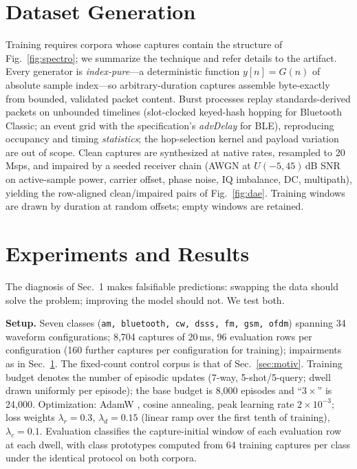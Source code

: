 \documentclass[10pt,twocolumn]{article}
\begin{document}
\section{Dataset Generation}
\label{sec:synth}
Training requires corpora whose captures contain the structure of
Fig.~\ref{fig:spectro}; we summarize the technique and refer details to
the artifact. Every generator is \emph{index-pure}---a deterministic
function $y[n]=G(n)$ of absolute sample index---so arbitrary-duration
captures assemble byte-exactly from bounded, validated packet content.
Burst processes replay standards-derived packets \cite{btcore} on
unbounded timelines (slot-clocked keyed-hash hopping for Bluetooth
Classic; an event grid with the specification's \textit{advDelay} for
BLE), reproducing occupancy and timing \emph{statistics}; the
hop-selection kernel and payload variation are out of scope. Clean
captures are synthesized at native rates, resampled to 20\,Msps, and
impaired by a seeded receiver chain (AWGN at $U(-5,45)$\,dB SNR on
active-sample power, carrier offset, phase noise, IQ imbalance, DC,
multipath), yielding the row-aligned clean/impaired pairs of
Fig.~\ref{fig:dae}. Training windows are drawn by duration at random
offsets; empty windows are retained.

\section{Experiments and Results}
\label{sec:exp}
The diagnosis of Sec.~1 makes falsifiable predictions: swapping the data
should solve the problem; improving the model should not. We test both.

\textbf{Setup.} Seven classes (\texttt{am, bluetooth, cw, dsss, fm, gsm,
ofdm}) spanning 34 waveform configurations; 8{,}704 captures of 20\,ms,
96 evaluation rows per configuration (160 further captures per
configuration for training); impairments as in Sec.~\ref{sec:synth}. The
fixed-count control corpus is that of Sec.~\ref{sec:motiv}. Training
budget denotes the number of episodic updates (7-way, 5-shot/5-query;
dwell drawn uniformly per episode); the base budget is 8{,}000 episodes
and ``$3\times$'' is 24{,}000. Optimization: AdamW \cite{loshchilov2019},
cosine annealing, peak learning rate $2{\times}10^{-3}$; loss weights
$\lambda_r{=}0.3$, $\lambda_d{=}0.15$ (linear ramp over the first tenth of
training), $\lambda_c{=}0.1$. Evaluation classifies the capture-initial
window of each evaluation row at each dwell, with class prototypes
computed from 64 training captures per class under the identical protocol
on both corpora.
\end{document}

